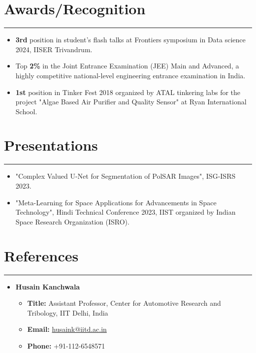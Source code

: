 \documentclass[11pt]{article}
\newlength{\sectionvspace}
\newlength{\sectionvspacee}
\begin{document}
\begin{itemize}[leftmargin=*,noitemsep,topsep=0pt]
\vspace{\sectionvspacee}
\section*{\bf Awards/Recognition}
\vspace{\sectionvspace}
\rule{\textwidth}{0.4pt}
\begin{itemize}[leftmargin=*,noitemsep,topsep=0pt]
	\item \textbf{3rd} position in student's flash talks at Frontiers symposium in Data science 2024, IISER Trivandrum.
	\item Top \textbf{2\%} in the Joint Entrance Examination (JEE) Main and Advanced, a highly competitive national-level engineering entrance examination in India.
	\item \textbf{1st} position in Tinker Fest 2018 organized by ATAL tinkering labs for the project "Algae Based Air Purifier and Quality Sensor" at Ryan International School.
\end{itemize}
		\vspace{\sectionvspacee}

	
	\vspace{\sectionvspacee}	
\section*{\bf Presentations}
\vspace{\sectionvspace}%
\rule{\textwidth}{0.4pt}
\begin{itemize}[leftmargin=*,noitemsep,topsep=0pt]
	\item "Complex Valued U-Net for Segmentation of PolSAR Images", ISG-ISRS 2023.
	\item "Meta-Learning for Space Applications for Advancements in Space Technology", Hindi Technical Conference 2023, IIST organized by Indian Space Research Organization (ISRO).
\end{itemize}

	\vspace{\sectionvspacee}
\section*{\bf References}
\vspace{\sectionvspace}%
\rule{\textwidth}{0.4pt}
\begin{itemize}[noitemsep,topsep=0pt]
	\item \textbf{Husain Kanchwala}
	\begin{itemize}[noitemsep,topsep=0pt]
		\item \textbf{Title:} Assistant Professor, Center for Automotive Research and Tribology, IIT Delhi, India
		\item \textbf{Email:} \href{mailto:husaink@iitd.ac.in}{husaink@iitd.ac.in}
		\item \textbf{Phone:} +91-112-6548571
	\end{itemize}
	

\end{itemize}
\end{itemize}
\end{document}
